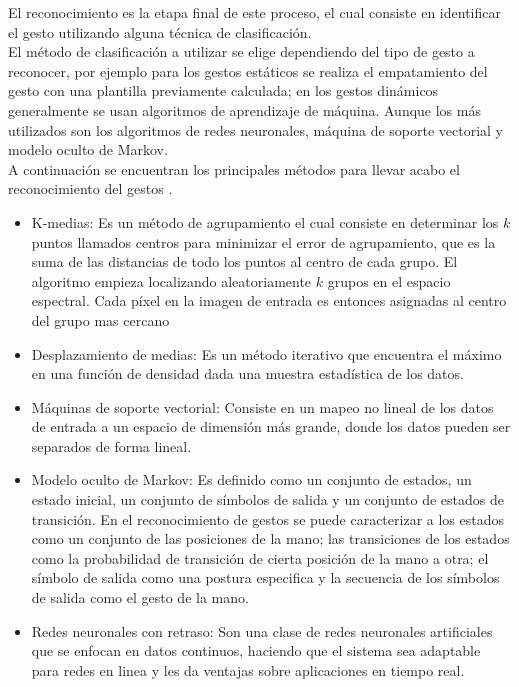 El reconocimiento es la etapa final de este proceso, el cual consiste en identificar el gesto utilizando alguna técnica de clasificación.\\
El método de clasificación a utilizar se elige dependiendo del tipo de gesto a reconocer, por ejemplo para los gestos estáticos se realiza el empatamiento del gesto con una plantilla previamente calculada; en los gestos dinámicos generalmente  se usan algoritmos de aprendizaje de máquina. Aunque los más utilizados son los algoritmos de redes neuronales, máquina de soporte vectorial y modelo oculto de Markov.\\ 
A continuación se encuentran los principales métodos para llevar acabo el reconocimiento del gestos \citep{Rautaray2012}. 
\begin{itemize}
	\item K-medias: Es un método de agrupamiento el cual consiste en determinar los $k$ puntos llamados centros para minimizar el error de agrupamiento, que es la suma de las distancias de todo los puntos al centro de cada grupo. El algoritmo empieza localizando aleatoriamente $k$ grupos en el espacio espectral. Cada p\'ixel en la imagen de entrada es entonces asignadas al centro del grupo mas cercano  
	\item Desplazamiento de medias: Es un método iterativo que encuentra el máximo en una función de densidad dada una muestra estadística de los datos.
	\item Máquinas de soporte vectorial: Consiste en un mapeo no lineal de los datos de entrada a un espacio de dimensi\'on m\'as grande, donde los datos pueden ser separados de forma lineal.  
	\item Modelo oculto de Markov: Es definido como un conjunto de estados, un estado inicial, un conjunto de símbolos de salida y un conjunto de estados de transición. En el reconocimiento de gestos se puede caracterizar a los estados como un conjunto de las posiciones de la mano; las  transiciones de los estados como la probabilidad de transición de cierta posición de la mano a otra; el símbolo de salida como una postura especifica y la secuencia de los símbolos de salida como  el gesto de la mano.   
	\item Redes neuronales con retraso: Son una clase de redes neuronales artificiales que se enfocan en datos continuos, haciendo que el sistema sea adaptable para redes en linea y les da ventajas sobre aplicaciones en tiempo real. 
\end{itemize}  




